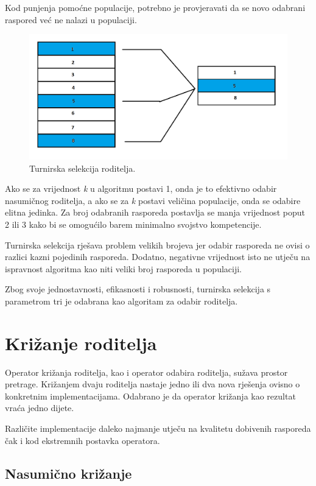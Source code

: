 \documentclass[times, utf8, zavrsni]{fer}
\begin{document}
Kod punjenja pomoćne populacije, potrebno je provjeravati da se novo odabrani raspored već ne nalazi u populaciji.

\begin{figure}[htb]
\centering
\includegraphics[width=14cm]{images/turnir.png}
\caption{Turnirska selekcija roditelja.}
\label{fig:turnir}
\end{figure}

Ako se za vrijednost \emph{k} u algoritmu postavi 1, onda je to efektivno odabir nasumičnog roditelja, a ako se za \emph{k} postavi veličina populacije, onda se odabire elitna jedinka. Za broj odabranih rasporeda postavlja se manja vrijednost poput 2 ili 3 kako bi se omogućilo barem minimalno svojstvo kompetencije.

Turnirska selekcija rješava problem velikih brojeva jer odabir rasporeda ne ovisi o razlici kazni pojedinih rasporeda. Dodatno, negativne vrijednost isto ne utječu na ispravnost algoritma kao niti veliki broj rasporeda u populaciji.

Zbog svoje jednostavnosti, efikasnosti i robusnosti, turnirska selekcija s parametrom tri je odabrana kao algoritam za odabir roditelja.

\section{Križanje roditelja}

Operator križanja roditelja, kao i operator odabira roditelja, sužava prostor pretrage. Križanjem dvaju roditelja nastaje jedno ili dva nova rješenja  ovisno o konkretnim implementacijama. Odabrano je da operator križanja kao rezultat vraća jedno dijete.

Različite implementacije daleko najmanje utječu na kvalitetu dobivenih rasporeda čak i kod ekstremnih postavka operatora.

\subsection{Nasumično križanje}
\end{document}
